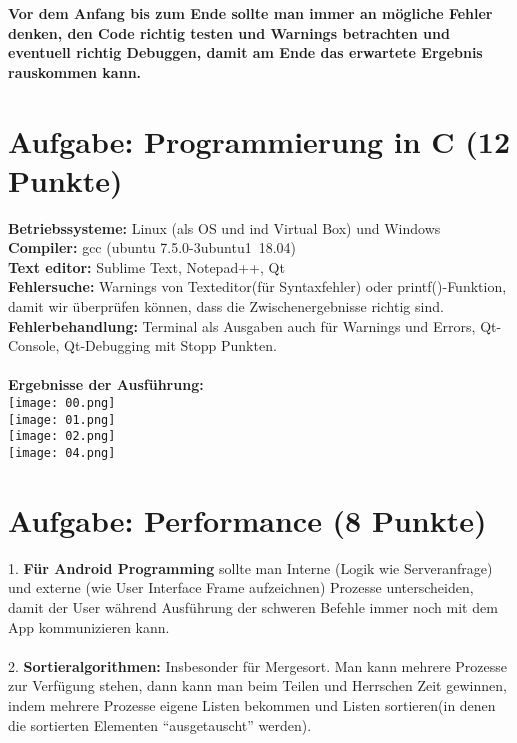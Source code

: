  \textbf{Vor dem Anfang bis zum Ende sollte man immer an mögliche Fehler denken, den Code richtig testen und Warnings betrachten und eventuell richtig Debuggen, damit am Ende das erwartete Ergebnis rauskommen kann.}


\section{Aufgabe: Programmierung in C \hfill (12 Punkte)}
 \textbf{Betriebssysteme:} Linux (als OS und ind Virtual Box) und Windows\\
 \textbf{Compiler:} gcc (ubuntu 7.5.0-3ubuntu1~18.04)\\ 
 \textbf{Text editor:} Sublime Text, Notepad++, Qt\\
 \textbf{Fehlersuche:} Warnings von Texteditor(für Syntaxfehler) oder printf()-Funktion, damit wir überprüfen können, dass die Zwischenergebnisse richtig sind. \\
 \textbf{Fehlerbehandlung:} Terminal als Ausgaben auch für Warnings und Errors, Qt-Console, Qt-Debugging mit Stopp Punkten.\\\\
\textbf{Ergebnisse der Ausführung:}\\
\texttt{[image: 00.png]}\\
\texttt{[image: 01.png]}\\
\texttt{[image: 02.png]}\\
\texttt{[image: 04.png]}\\


\section{Aufgabe: Performance \hfill (8 Punkte)}
1. \textbf{Für Android Programming} sollte man Interne (Logik wie Serveranfrage) und externe (wie User Interface Frame aufzeichnen) Prozesse unterscheiden, damit der User während Ausführung der schweren Befehle immer noch mit dem App kommunizieren kann.\\\\
2. \textbf{Sortieralgorithmen:} Insbesonder für Mergesort. Man kann mehrere Prozesse zur Verfügung stehen, dann kann man beim Teilen und Herrschen Zeit gewinnen, indem mehrere Prozesse eigene Listen bekommen und Listen sortieren(in denen die sortierten Elementen “ausgetauscht” werden).



